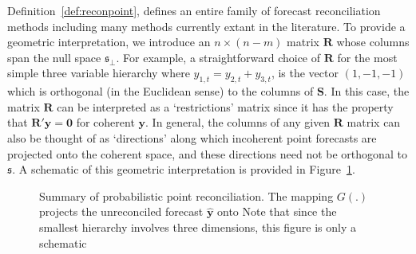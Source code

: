 \documentclass[a4paper, 11pt]{article}
\theoremstyle{theo}
\theoremstyle{definition}
\begin{document}
Definition~\ref{def:reconpoint}, defines an entire family of forecast reconciliation methods including many methods currently extant in the literature. To provide a geometric interpretation, we introduce an $n \times (n-m)$ matrix $\bm{R}$ whose columns span the null space $\mathfrak{s}_{\perp}$.  For example, a straightforward choice of $\bm{R}$ for the most simple three variable hierarchy where $y_{1,t}=y_{2,t}+y_{3,t}$, is the vector $(1,-1,-1)$ which is orthogonal (in the Euclidean sense) to the columns of $\bm{S}$.  In this case, the matrix $\bm{R}$ can be interpreted as a `restrictions' matrix since it has the property that $\bm{R}'\bm{y}=\bm{0}$ for coherent $\bm{y}$. In general, the columns of any given $\bm{R}$ matrix can also be thought of as `directions' along which incoherent point forecasts are projected onto the coherent space, and these directions need not be orthogonal to $\mathfrak{s}$.  A schematic of this geometric interpretation is provided in Figure~\ref{fig:pointfr_sch}. 
%


\begin{figure}
	
	\caption{Summary of probabilistic point reconciliation.  The mapping $G(.)$ projects the unreconciled forecast $\hat{\bm y}$ onto   Note that since the smallest hierarchy involves three dimensions, this figure is only a schematic}\label{fig:pointfr_sch} 
\end{figure}
\end{document}

